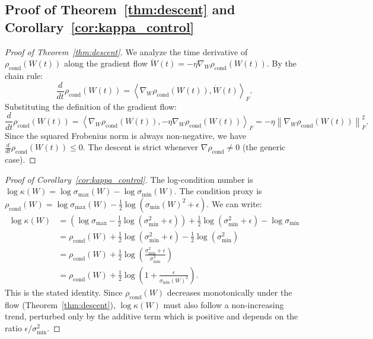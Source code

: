 \documentclass{opt2025}
\newcommand{\norm}[1]{\left\lVert #1 \right\rVert}
\begin{document}
\subsection{Proof of Theorem~\ref{thm:descent} and Corollary~\ref{cor:kappa_control}}
\begin{proof}[Proof of Theorem~\ref{thm:descent}]
We analyze the time derivative of $\rho_{\text{cond}}(W(t))$ along the gradient flow $\dot{W}(t) = -\eta\nabla_W \rho_{\text{cond}}(W(t))$. By the chain rule:
\[
\frac{d}{dt}\rho_{\text{cond}}(W(t)) = \left\langle \nabla_W \rho_{\text{cond}}(W(t)), \dot{W}(t) \right\rangle_F.
\]
Substituting the definition of the gradient flow:
\[
\frac{d}{dt}\rho_{\text{cond}}(W(t)) = \left\langle \nabla_W \rho_{\text{cond}}(W(t)), -\eta\nabla_W \rho_{\text{cond}}(W(t)) \right\rangle_F = -\eta \norm{\nabla_W \rho_{\text{cond}}(W(t))}_F^2.
\]
Since the squared Frobenius norm is always non-negative, we have $\frac{d}{dt}\rho_{\text{cond}}(W(t)) \le 0$. The descent is strict whenever $\nabla\rho_{\text{cond}}\neq 0$ (the generic case).
\end{proof}

\begin{proof}[Proof of Corollary~\ref{cor:kappa_control}]
The log-condition number is $\log\kappa(W) = \log\sigma_{\max}(W) - \log\sigma_{\min}(W)$. The condition proxy is $\rho_{\text{cond}}(W) = \log\sigma_{\max}(W) - \frac{1}{2}\log(\sigma_{\min}(W)^2 + \epsilon)$. We can write:
\begin{align*}
\log\kappa(W) &= \left(\log\sigma_{\max} - \tfrac{1}{2}\log(\sigma_{\min}^2+\epsilon)\right) + \tfrac{1}{2}\log(\sigma_{\min}^2+\epsilon) - \log\sigma_{\min} \\
&= \rho_{\text{cond}}(W) + \tfrac{1}{2}\log(\sigma_{\min}^2+\epsilon) - \tfrac{1}{2}\log(\sigma_{\min}^2) \\
&= \rho_{\text{cond}}(W) + \tfrac{1}{2}\log\left(\frac{\sigma_{\min}^2+\epsilon}{\sigma_{\min}^2}\right) \\
&= \rho_{\text{cond}}(W) + \tfrac{1}{2}\log\left(1 + \frac{\epsilon}{\sigma_{\min}(W)^2}\right).
\end{align*}
This is the stated identity. Since $\rho_{\text{cond}}(W)$ decreases monotonically under the flow (Theorem~\ref{thm:descent}), $\log\kappa(W)$ must also follow a non-increasing trend, perturbed only by the additive term which is positive and depends on the ratio $\epsilon/\sigma_{\min}^2$.
\end{proof}
\end{document}
